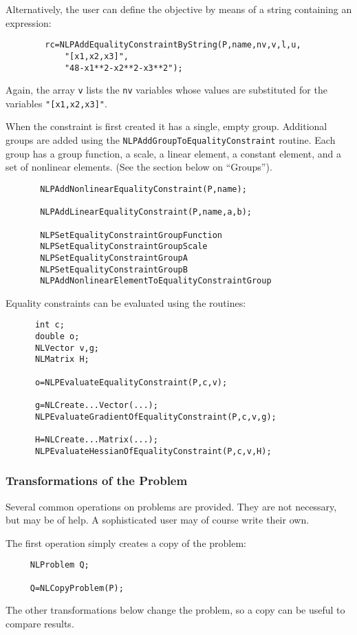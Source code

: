 \documentclass[12pt]{article}
\begin{document}
     Alternatively, the user can define the objective by means of a string containing an expression:
     \begin{verbatim}
        rc=NLPAddEqualityConstraintByString(P,name,nv,v,l,u,
            "[x1,x2,x3]",
            "48-x1**2-x2**2-x3**2");
     \end{verbatim}
     Again, the array {\tt v} lists the {\tt nv} variables whose values are substituted for the variables
     {\tt "[x1,x2,x3]"}.

     When the constraint is first created it has a single, empty group. Additional groups are added using the
     {\tt NLPAdd\-Group\-To\-Equality\-Constraint} routine. Each group has a group function, a scale, a linear element,
     a constant element, and a set of nonlinear elements. (See the section below on ``Groups'').
     \begin{verbatim}
       NLPAddNonlinearEqualityConstraint(P,name);

       NLPAddLinearEqualityConstraint(P,name,a,b);

       NLPSetEqualityConstraintGroupFunction
       NLPSetEqualityConstraintGroupScale
       NLPSetEqualityConstraintGroupA
       NLPSetEqualityConstraintGroupB
       NLPAddNonlinearElementToEqualityConstraintGroup
     \end{verbatim}

     Equality constraints can be evaluated using the routines:
     \begin{verbatim}
      int c;
      double o;
      NLVector v,g;
      NLMatrix H;

      o=NLPEvaluateEqualityConstraint(P,c,v);

      g=NLCreate...Vector(...);
      NLPEvaluateGradientOfEqualityConstraint(P,c,v,g);

      H=NLCreate...Matrix(...);
      NLPEvaluateHessianOfEqualityConstraint(P,c,v,H);
     \end{verbatim}

   \subsubsection{Transformations of the Problem}

    Several common operations on problems are provided. They are not necessary, but may be of help. A sophisticated 
    user may of course write their own.

    The first operation simply creates a copy of the problem:
    \begin{verbatim}
     NLProblem Q;

     Q=NLCopyProblem(P);
    \end{verbatim}
    The other transformations below change the problem, so a copy can be useful to compare results.
\end{document}

